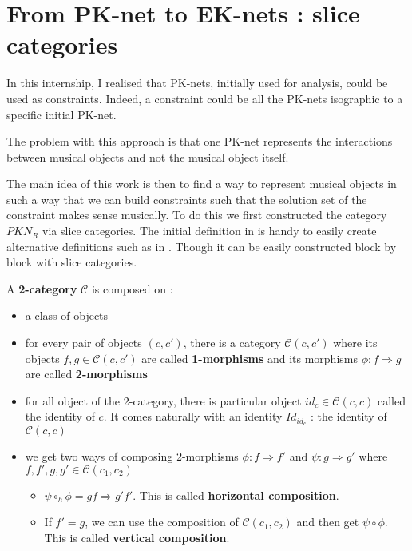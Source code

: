 \section{From PK-net to EK-nets : slice categories}
In this internship, I realised that PK-nets, initially used for analysis, could be used as constraints. Indeed, a constraint could be all the PK-nets isographic to a specific initial PK-net.

The problem with this approach is that one PK-net represents the interactions between musical objects and not the musical object itself.

The main idea of this work is then to find a way to represent musical objects in such a way that we can build constraints such that the solution set of the constraint makes sense musically. To do this we first constructed the category $PKN_R$ via slice categories. The initial definition in \cite{popoff2015categorical} is handy to easily create alternative definitions such as in \cite{popoff2016relational}. Though it can be easily constructed block by block with slice categories.


\begin{defn}
    A \textbf{2-category} $\mathcal{C}$ is composed on :
    \begin{itemize}
        \item a class of objects
        \item for every pair of objects $(c,c')$, there is a category $\mathcal{C}(c,c')$ where its objects $f,g\in \mathcal{C}(c,c')$ are called \textbf{1-morphisms} and its morphisms $\phi : f\Rightarrow g$ are called \textbf{2-morphisms}
        \item for all object of the 2-category, there is particular object $id_c\in \mathcal{C}(c,c)$ called the identity of $c$. It comes naturally with an identity $Id_{id_c}$ : the identity of  $\mathcal{C}(c,c)$
        \item we get two ways of composing 2-morphisms $\phi : f\Rightarrow f'$
              and $\psi : g\Rightarrow g'$ where $f,f',g,g' \in \mathcal{C}(c_1,c_2)$
              \begin{itemize}
                  \item $\psi\circ_h\phi = gf\Rightarrow g'f'$. This is called \textbf{horizontal composition}.
                  \item If $f' = g$, we can use the composition of $\mathcal{C}(c_1,c_2)$ and then get $\psi\circ\phi$. This is called \textbf{vertical composition}.
              \end{itemize}

    \end{itemize}
\end{defn}

